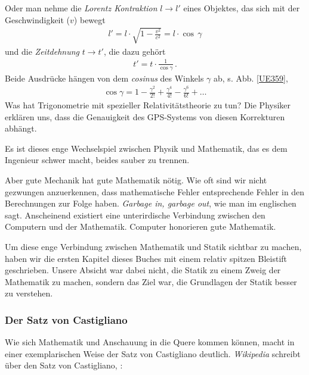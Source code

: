 Oder man nehme die {\em Lorentz Kontraktion\/} $l \to l'$ eines Objektes, das sich mit der Geschwindigkeit ($v$) bewegt
\begin{align}
l' = l \cdot \sqrt{1 - \frac{v^2}{c^2}} = l \cdot \cos\,\gamma
\end{align}
und die {\em Zeitdehnung\/} $t \to t'$, die dazu geh\"{o}rt
\begin{align}
t' = t \cdot \frac{1}{\cos \gamma}\,.
\end{align}
Beide Ausdr\"{u}cke h\"{a}ngen von dem {\em cosinus\/} des Winkels $\gamma$ ab, s. Abb. \ref{UE359},
\begin{align}
\cos \gamma = 1 - \frac{\gamma^2}{2!} + \frac{\gamma^4}{4!} - \frac{\gamma^6}{6!} + \ldots
\end{align}
Was hat Trigonometrie mit spezieller Relativit\"{a}tstheorie zu tun? Die Physiker erkl\"{a}ren uns, dass die Genauigkeit des GPS-Systems von diesen Korrekturen abh\"{a}ngt.

Es ist dieses enge Wechselspiel zwischen Physik und Mathematik, das es dem Ingenieur schwer macht, beides sauber zu trennen.


Aber gute Mechanik hat gute Mathematik n\"{o}tig. Wie oft sind wir nicht gezwungen anzuerkennen, dass mathematische Fehler entsprechende Fehler in den Berechnungen zur Folge haben. {\em Garbage in, garbage out\/}, wie man im englischen sagt. Anscheinend existiert eine unterirdische Verbindung zwischen den Computern und der Mathematik. Computer honorieren gute Mathematik.

Um diese enge Verbindung zwischen Mathematik und Statik sichtbar zu machen, haben wir die ersten Kapitel dieses Buches mit einem relativ spitzen Bleistift geschrieben. Unsere Absicht war dabei nicht, die Statik zu einem Zweig der Mathematik zu machen, sondern das Ziel war, die Grundlagen der Statik besser zu verstehen.

{\textcolor{chapterTitleBlue}{\subsubsection*{Der Satz von Castigliano}}}
Wie sich Mathematik und Anschauung in die Quere kommen k\"{o}nnen, macht in einer exemplarischen Weise der Satz von Castigliano deutlich. {\em Wikipedia\/} schreibt \"{u}ber den Satz von Castigliano, \cite{Ca}:

